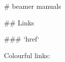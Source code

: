 # beamer manuals


## Links

### `href`

Colourful links:
~~~~
\hypersetup{colorlinks,linkcolor=,urlcolor=blue}
~~~~
